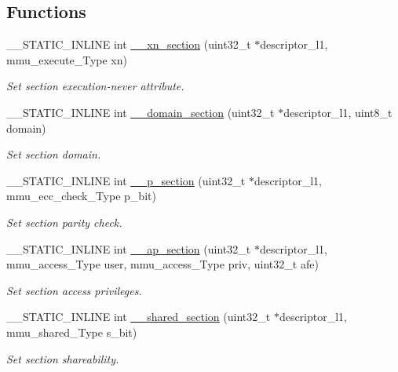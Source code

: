 \subsection*{Functions}
\begin{DoxyCompactItemize}
\item 
\+\_\+\+\_\+\+S\+T\+A\+T\+I\+C\+\_\+\+I\+N\+L\+I\+NE int \hyperlink{group__MMU__Functions_gaac58bd6af8c207174df553059a28263e}{\+\_\+\+\_\+xn\+\_\+section} (uint32\+\_\+t $\ast$descriptor\+\_\+l1, mmu\+\_\+execute\+\_\+\+Type xn)
\begin{DoxyCompactList}\small\item\em Set section execution-\/never attribute. \end{DoxyCompactList}\item 
\+\_\+\+\_\+\+S\+T\+A\+T\+I\+C\+\_\+\+I\+N\+L\+I\+NE int \hyperlink{group__MMU__Functions_gab9c5062b00045439b84362310c3bc5d0}{\+\_\+\+\_\+domain\+\_\+section} (uint32\+\_\+t $\ast$descriptor\+\_\+l1, uint8\+\_\+t domain)
\begin{DoxyCompactList}\small\item\em Set section domain. \end{DoxyCompactList}\item 
\+\_\+\+\_\+\+S\+T\+A\+T\+I\+C\+\_\+\+I\+N\+L\+I\+NE int \hyperlink{group__MMU__Functions_ga47d76089fa83ddf1ad420f37c2787f8e}{\+\_\+\+\_\+p\+\_\+section} (uint32\+\_\+t $\ast$descriptor\+\_\+l1, mmu\+\_\+ecc\+\_\+check\+\_\+\+Type p\+\_\+bit)
\begin{DoxyCompactList}\small\item\em Set section parity check. \end{DoxyCompactList}\item 
\+\_\+\+\_\+\+S\+T\+A\+T\+I\+C\+\_\+\+I\+N\+L\+I\+NE int \hyperlink{group__MMU__Functions_ga5f069f471adb154153051c570c3a6ab2}{\+\_\+\+\_\+ap\+\_\+section} (uint32\+\_\+t $\ast$descriptor\+\_\+l1, mmu\+\_\+access\+\_\+\+Type user, mmu\+\_\+access\+\_\+\+Type priv, uint32\+\_\+t afe)
\begin{DoxyCompactList}\small\item\em Set section access privileges. \end{DoxyCompactList}\item 
\+\_\+\+\_\+\+S\+T\+A\+T\+I\+C\+\_\+\+I\+N\+L\+I\+NE int \hyperlink{group__MMU__Functions_ga9913b6ac45889fea12f9caa6292b89b3}{\+\_\+\+\_\+shared\+\_\+section} (uint32\+\_\+t $\ast$descriptor\+\_\+l1, mmu\+\_\+shared\+\_\+\+Type s\+\_\+bit)
\begin{DoxyCompactList}\small\item\em Set section shareability. \end{DoxyCompactList}\item 

\end{DoxyCompactItemize}
